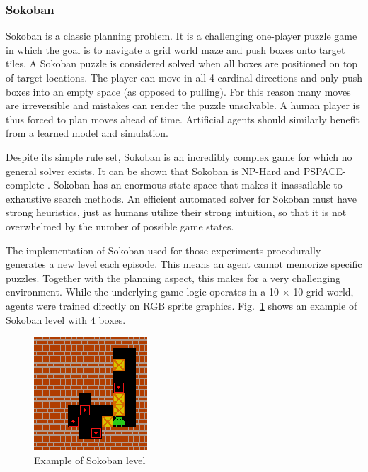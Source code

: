 \subsubsection{Sokoban}


Sokoban is a classic planning problem. It is a challenging one-player puzzle game in which the goal is to navigate a grid world maze and push boxes onto target tiles. A Sokoban puzzle is considered solved when all boxes are positioned on top of target locations. The player can move in all 4 cardinal directions and only push boxes into an empty space (as opposed to pulling). For this reason many moves are irreversible and mistakes can render the puzzle unsolvable. A human player is thus forced to plan moves ahead of time. Artificial agents should similarly benefit from a learned model and simulation.

Despite its simple rule set, Sokoban is an incredibly complex game for which no general solver exists. It can be shown that Sokoban is NP-Hard and PSPACE-complete \cite{Benchmark.Sokoban}. Sokoban has an enormous state space that makes it inassailable to exhaustive search methods. An efficient automated solver for Sokoban must have strong heuristics, just as humans utilize their strong intuition, so that it is not overwhelmed by the number of possible game states.

The implementation of Sokoban\cite{Code.Sokoban} used for those experiments procedurally generates a new level each episode. This means an agent cannot memorize specific puzzles. Together with the planning aspect, this makes for a very challenging environment. While the underlying game logic operates in a 10 × 10 grid world, agents were trained directly on RGB sprite graphics. Fig.~\ref{Fig.Sokoban} shows an example of Sokoban level with 4 boxes.


\begin{figure}[H]
\includegraphics[]{figures/Sokoban.png}
\caption[Sokoban]{Example of Sokoban level}
\label{Fig.Sokoban}
\end{figure}


